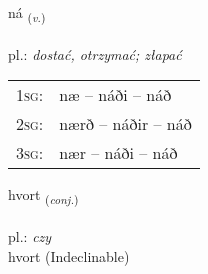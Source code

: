 \documentclass[frontgrid, backgrid]{flacards}\usepackage[]{graphicx}\usepackage[]{xcolor}
\begin{document}
{ná \small{\textsubscript{(\textit{v.})}} \\[1ex] %
\textphonetic{[nauː]} \\
pl.: \emph{dostać, otrzymać; złapać} \\  [2ex]
\renewcommand*{\arraystretch}{0.8}
\begin{tabular}{p{1cm}l}
\textsc{1sg}: & næ -- náði -- náð \\ 
\textsc{2sg}: & nærð -- náðir -- náð \\ 
\textsc{3sg}: & nær -- náði -- náð \\ 
\end{tabular}
}


\renewcommand{\flhead}{\vskip5pt \fboxsep=0pt {\small\bfseries\footnotesize Samtenging | Conjuction}}
\renewcommand{\fcfoot}{\vskip5pt \fboxsep=0pt \hspace{2pt}{\small\bfseries\footnotesize 1K}}

\renewcommand{\blhead}{\vskip5pt {\small\bfseries\footnotesize Samtenging | Conjuction }}
\renewcommand{\bcfoot}{\vskip5pt \hspace{2pt}{\small\bfseries\footnotesize 1K}}


{hvort \small{\textsubscript{(\textit{conj.})}} \\[1ex]
\textphonetic{[kʰvɔr̥t]} \\
pl.: \emph{czy} \\  [2ex]
hvort (Indeclinable)}

\renewcommand{\flhead}{\vskip5pt \fboxsep=0pt {\small\bfseries\footnotesize Lýsingarorð | Adjective}}
\renewcommand{\fcfoot}{\vskip5pt \fboxsep=0pt \hspace{2pt}{\small\bfseries\footnotesize 1K}}

\renewcommand{\blhead}{\vskip5pt {\small\bfseries\footnotesize Lýsingarorð | Adjective }}
\renewcommand{\bcfoot}{\vskip5pt \hspace{2pt}{\small\bfseries\footnotesize 1K}}
\end{document}
